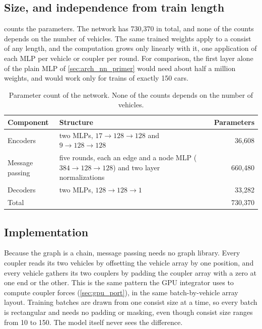 \subsection{Size, and independence from train length}

 counts the parameters. The network has 730,370 in total, and none of the counts depends on the number of vehicles. The same trained weights apply to a consist of any length, and the computation grows only linearly with it, one application of each MLP per vehicle or coupler per round. For comparison, the first layer alone of the plain MLP of \cref{sec:arch_nn_primer} would need about half a million weights, and would work only for trains of exactly 150 cars.

\begin{table}[htbp]
    \centering
    \begin{tabular}{lp{7.2cm}r}
        \toprule
        Component & Structure & Parameters \\
        \midrule
        Encoders        & two MLPs, $17 \to 128 \to 128$ and $9 \to 128 \to 128$ & 36,608 \\
        Message passing & five rounds, each an edge and a node MLP ($384 \to 128 \to 128$) and two layer normalizations & 660,480 \\
        Decoders        & two MLPs, $128 \to 128 \to 1$ & 33,282 \\
        \midrule
        Total                    &                                                  & 730,370 \\
        \bottomrule
    \end{tabular}
    \caption{Parameter count of the network. None of the counts depends on the number of vehicles.}
    \label{tab:arch_params}
\end{table}

\subsection{Implementation}

Because the graph is a chain, message passing needs no graph library. Every coupler reads its two vehicles by offsetting the vehicle array by one position, and every vehicle gathers its two couplers by padding the coupler array with a zero at one end or the other. This is the same pattern the GPU integrator uses to compute coupler forces (\cref{sec:gpu_port}), in the same batch-by-vehicle array layout. Training batches are drawn from one consist size at a time, so every batch is rectangular and needs no padding or masking, even though consist size ranges from 10 to 150. The model itself never sees the difference.

